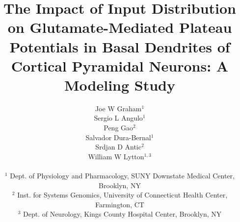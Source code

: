 \documentclass[]{article}
\begin{document}
\title{The Impact of Input Distribution on Glutamate-Mediated Plateau Potentials in Basal Dendrites of Cortical Pyramidal Neurons: A Modeling Study}

\author{
Joe W Graham$^{1}$\\
Sergio L Angulo$^{1}$\\
Peng Gao$^{2}$\\
Salvador Dura-Bernal$^{1}$\\
Srdjan D Antic$^{2}$\\
William W Lytton$^{1,3}$\\
\\
$^1$ Dept. of Physiology and Pharmacology, SUNY Downstate Medical Center, Brooklyn, NY \\
$^2$ Inst. for Systems Genomics, University of Connecticut Health Center, Farmington, CT \\
$^3$ Dept. of Neurology, Kings County Hospital Center, Brooklyn, NY}

\titlepage
\maketitle







\def\bpath{bib}

\end{document}

